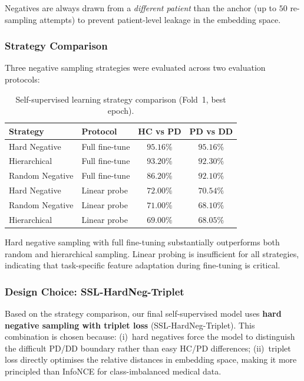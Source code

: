 \documentclass[conference]{IEEEtran}
\begin{document}
Negatives are always drawn from a \emph{different patient} than the anchor (up to $50$ re-sampling attempts) to prevent patient-level leakage in the embedding space.

\subsubsection{Strategy Comparison}

Three negative sampling strategies were evaluated across two evaluation protocols:

\begin{table}[H]
\centering
\caption{Self-supervised learning strategy comparison (Fold~1, best epoch).}
\label{tab:ssl_results}
\begin{tabular}{llcc}
\toprule
\textbf{Strategy} & \textbf{Protocol} & \textbf{HC vs PD} & \textbf{PD vs DD} \\
\midrule
Hard Negative     & Full fine-tune  & $\mathbf{95.16\%}$ & $\mathbf{95.16\%}$ \\
Hierarchical      & Full fine-tune  & $93.20\%$          & $92.30\%$          \\
Random Negative   & Full fine-tune  & $86.20\%$          & $92.10\%$          \\
Hard Negative     & Linear probe    & $72.00\%$          & $70.54\%$          \\
Random Negative   & Linear probe    & $71.00\%$          & $68.10\%$          \\
Hierarchical      & Linear probe    & $69.00\%$          & $68.05\%$          \\
\bottomrule
\end{tabular}
\end{table}

\noindent Hard negative sampling with full fine-tuning substantially outperforms both random and hierarchical sampling. Linear probing is insufficient for all strategies, indicating that task-specific feature adaptation during fine-tuning is critical.

\subsubsection{Design Choice: SSL-HardNeg-Triplet}

Based on the strategy comparison, our final self-supervised model uses \textbf{hard negative sampling with triplet loss} (SSL-HardNeg-Triplet). This combination is chosen because: (i)~hard negatives force the model to distinguish the difficult PD/DD boundary rather than easy HC/PD differences; (ii)~triplet loss directly optimises the relative distances in embedding space, making it more principled than InfoNCE for class-imbalanced medical data.
\end{document}

